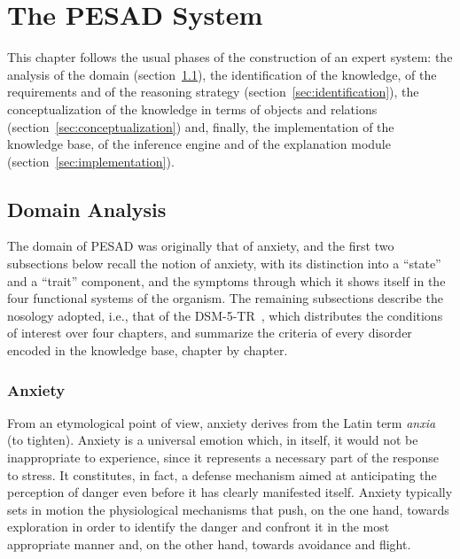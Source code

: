 \chapter{The PESAD System}
\label{chap:system}

This chapter follows the usual phases of the construction of an expert system:
the analysis of the domain (section~\ref{sec:domain}), the identification of
the knowledge, of the requirements and of the reasoning strategy
(section~\ref{sec:identification}), the conceptualization of the knowledge in
terms of objects and relations (section~\ref{sec:conceptualization}) and,
finally, the implementation of the knowledge base, of the inference engine and
of the explanation module (section~\ref{sec:implementation}).

\section{Domain Analysis}
\label{sec:domain}

The domain of PESAD was originally that of anxiety, and the first two
subsections below recall the notion of anxiety, with its distinction into a
``state'' and a ``trait'' component, and the symptoms through which it shows
itself in the four functional systems of the organism. The remaining
subsections describe the nosology adopted, i.e., that of the DSM-5-TR~\cite{dsm},
which distributes the conditions of interest over four chapters, and summarize
the criteria of every disorder encoded in the knowledge base, chapter by
chapter.

\subsection{Anxiety}

From an etymological point of view, anxiety derives from the Latin term
\emph{anxia} (to tighten). Anxiety is a universal emotion which, in itself, it
would not be inappropriate to experience, since it represents a necessary part
of the response to stress. It constitutes, in fact, a defense mechanism aimed at
anticipating the perception of danger even before it has clearly manifested
itself. Anxiety typically sets in motion the physiological mechanisms that push,
on the one hand, towards exploration in order to identify the danger and confront
it in the most appropriate manner and, on the other hand, towards avoidance and
flight.

